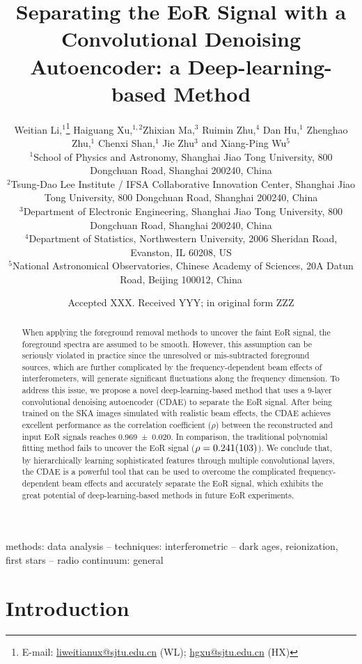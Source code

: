 \documentclass[fleqn,usenatbib]{mnras}
\title[EoR Signal Separation with a CDAE]{%
  Separating the EoR Signal with a Convolutional Denoising Autoencoder:
  a Deep-learning-based Method
}
\author[Li~et~al.]{%
Weitian Li,$^{1}$\thanks{E-mail:
  \href{mailto:liweitianux@sjtu.edu.cn}{liweitianux@sjtu.edu.cn} (WL);
  \href{mailto:hgxu@sjtu.edu.cn}{hgxu@sjtu.edu.cn} (HX)}
Haiguang Xu,$^{1,2}$\footnotemark[1]
Zhixian Ma,$^{3}$
Ruimin Zhu,$^{4}$
Dan Hu,$^{1}$
Zhenghao Zhu,$^{1}$
\newauthor  %
Chenxi Shan,$^{1}$
Jie Zhu$^{3}$
and
Xiang-Ping Wu$^{5}$
\\
$^{1}${School of Physics and Astronomy,
  Shanghai Jiao Tong University,
  800 Dongchuan Road, Shanghai 200240, China} \\
$^{2}${Tsung-Dao Lee Institute / IFSA Collaborative Innovation Center,
  Shanghai Jiao Tong University,
  800 Dongchuan Road, Shanghai 200240, China} \\
$^{3}${Department of Electronic Engineering,
  Shanghai Jiao Tong University,
  800 Dongchuan Road, Shanghai 200240, China} \\
$^{4}${Department of Statistics,
  Northwestern University,
  2006 Sheridan Road, Evanston, IL 60208, US} \\
$^{5}${National Astronomical Observatories,
  Chinese Academy of Sciences,
  20A Datun Road, Beijing 100012, China}
}
\date{Accepted XXX. Received YYY; in original form ZZZ}
\begin{document}
\label{firstpage}
\pagerange{\pageref{firstpage}--\pageref{lastpage}}
\maketitle

%
%
\begin{abstract}
When applying the foreground removal methods to uncover the faint EoR
signal, the foreground spectra are assumed to be smooth.
However, this assumption can be seriously violated in practice since
the unresolved or mis-subtracted foreground sources, which are further
complicated by the frequency-dependent beam effects of interferometers,
will generate significant fluctuations along the frequency dimension.
To address this issue, we propose a novel deep-learning-based method
that uses a 9-layer convolutional denoising autoencoder (CDAE) to
separate the EoR signal.
After being trained on the SKA images simulated with realistic beam
effects, the CDAE achieves excellent performance as the correlation
coefficient ($\rho$) between the reconstructed and input EoR signals
reaches \num{0.969 +- 0.020}.
In comparison, the traditional polynomial fitting method fails to
uncover the EoR signal ($\rho = \num{0.241 +- 0.103}$).
We conclude that, by hierarchically learning sophisticated features
through multiple convolutional layers, the CDAE is a powerful tool that
can be used to overcome the complicated frequency-dependent beam effects
and accurately separate the EoR signal, which exhibits the great
potential of deep-learning-based methods in future EoR experiments.
\end{abstract}

\begin{keywords}
methods: data analysis --
techniques: interferometric --
dark ages, reionization, first stars --
radio continuum: general
\end{keywords}



\section{Introduction}
\label{sec:intro}
\end{document}
